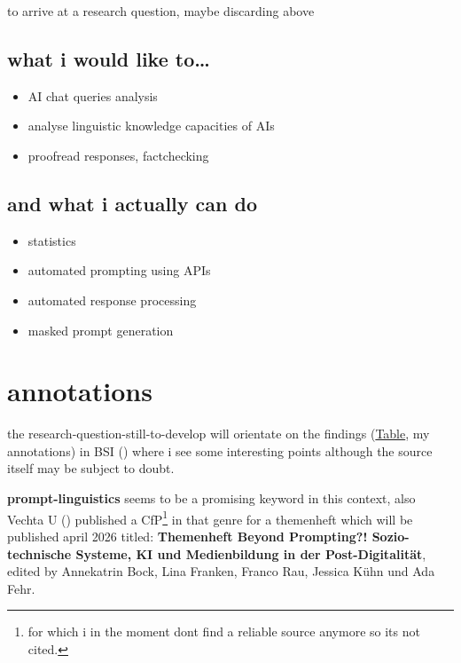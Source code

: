 \documentclass[
  letterpaper,
  DIV=11,
  numbers=noendperiod]{scrartcl}
\providecommand{\tightlist}{%
  \setlength{\itemsep}{0pt}\setlength{\parskip}{0pt}}
\begin{document}
to arrive at a research question, maybe discarding above

\subsection{what i would like to\ldots{}}\label{what-i-would-like-to}

\begin{itemize}
\tightlist
\item
  AI chat queries analysis
\item
  analyse linguistic knowledge capacities of AIs
\item
  proofread responses, factchecking
\end{itemize}

\subsection{\texorpdfstring{and what i actually \textbf{can}
do}{and what i actually can do}}\label{and-what-i-actually-can-do}

\begin{itemize}
\tightlist
\item
  statistics
\item
  automated prompting using APIs
\item
  automated response processing
\item
  masked prompt generation
\end{itemize}

\section{annotations}\label{annotations}

the research-question-still-to-develop will orientate on the findings
(\href{qa.qmd\#tbl_qa}{Table}, my annotations) in BSI
() where i see some interesting points
although the source itself may be subject to doubt.

\textbf{prompt-linguistics} seems to be a promising keyword in this
context, also Vechta U ()
published a CfP\footnote{for which i in the moment dont find a reliable
  source anymore so its not cited.} in that genre for a themenheft which
will be published april 2026 titled: \textbf{Themenheft Beyond
Prompting?! Sozio-technische Systeme, KI und Medienbildung in der
Post-Digitalität}, edited by Annekatrin Bock, Lina Franken, Franco Rau,
Jessica Kühn und Ada Fehr.
\end{document}
